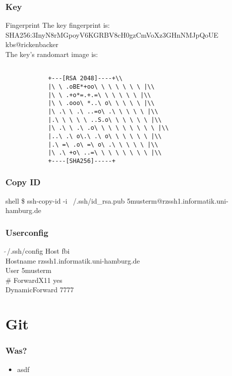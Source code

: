\documentclass{beamer}
\begin{document}
    \begin{frame}
        \frametitle{Key}
        \begin{block}{Fingerprint}
            The key fingerprint is: \\
            SHA256:3InyN8rMGpoyV6KGRBV8cH0gzCmVoXz3GHnNMJpQoUE kbs@rickenbacker\\
            The key's randomart image is:\\
            \begin{verbatim}

            +---[RSA 2048]----+\\
            |\ \ .oBE*+oo\ \ \ \ \ \ \ |\\
            |\ \ .+o*=.+.=\ \ \ \ \ \ |\\
            |\ \ .ooo\ *..\ o\ \ \ \ \ |\\
            |\ .\ \ .\ ..=o\ .\ \ \ \ \ |\\
            |.\ \ \ \ \ ..S.o\ \ \ \ \ \ |\\
            |\ .\ \ .\ .o\ \ \ \ \ \ \ \ \ |\\
            |..\ .\ o\.\ .\ o\ \ \ \ \ \ |\\
            |.\ =\ .o\ =\ o\ .\ \ \ \ \ |\\
            |\ .\ +o\ ..=\ \ \ \ \ \ \ \ |\\
            +----[SHA256]-----+
        \end{verbatim}
        \end{block}
    \end{frame}
    \begin{frame}
        \frametitle{Copy ID}
        \begin{block}{shell}
            \small{\$ ssh-copy-id -i ~/.ssh/id\_rsa.pub 5musterm@rzssh1.informatik.uni-hamburg.de}

        \end{block}
    \end{frame}
    \begin{frame}
        \frametitle{Userconfig}
        \begin{block}{$\tilde \ $/.ssh/config}
            Host fbi\\
            \qquad Hostname rzssh1.informatik.uni-hamburg.de\\
            \qquad User 5musterm\\
            \qquad # ForwardX11 yes\\
            \qquad DynamicForward 7777\\
        \end{block}
    \end{frame}
\section{Git}
\begin{frame}
    \frametitle{Was?}
    \begin{itemize}
        \item asdf
    \end{itemize}
\end{frame}
\end{document}

